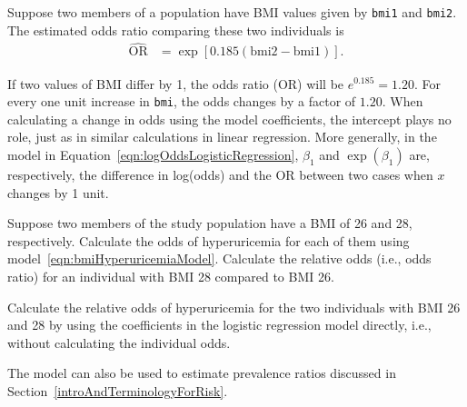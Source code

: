 Suppose two members of a population have BMI values given by \texttt{bmi1} and \texttt{bmi2}. The estimated odds ratio comparing these two individuals is
\begin{align*}
  \widehat{\text{OR}} &= \exp[0.185(\text{bmi2} - \text{bmi1})].
\end{align*}

If two values of BMI differ by 1, the odds ratio (OR) will be $e^{0.185} = 1.20$. For every one unit increase in \texttt{bmi}, the odds changes by a factor of $1.20$. When calculating a change in odds using the model coefficients, the intercept plays no role, just as in similar calculations in linear regression.  More generally, in the model in Equation~\ref{eqn:logOddsLogisticRegression}, $\beta_1$ and $\exp(\beta_1)$ are, respectively, the difference in log(odds) and the OR between two cases when $x$ changes by 1 unit.

\begin{exercisewrap}
\begin{nexercise}
  Suppose two members of the study population have a BMI of 26 and 28, respectively.  Calculate the odds of hyperuricemia for each of them using
model~\ref{eqn:bmiHyperuricemiaModel}.  Calculate the relative odds (i.e., odds ratio) for an individual with BMI 28 compared to BMI 26.
\footnotemark{}
\end{nexercise}
\end{exercisewrap}

\begin{exercisewrap}
  \begin{nexercise}
    Calculate the relative odds of hyperuricemia for the two individuals with BMI 26 and 28 by using the coefficients in the logistic regression model directly, i.e., without calculating the individual odds.
    \footnotemark{}
  \end{nexercise}
\end{exercisewrap}

The model can also be used to estimate prevalence ratios discussed in Section~\ref{introAndTerminologyForRisk}.

